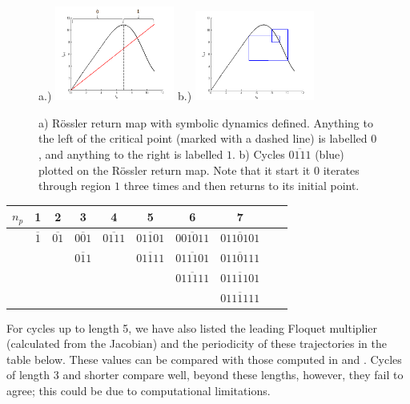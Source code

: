 \documentclass[12 pt]{article}
\begin{document}
\begin{figure}[h]
\centering
a.)  \includegraphics[width=0.35\textwidth]{Figs/Section4/kcdemon.png}
b.)  \includegraphics[width=0.35\textwidth]{Figs/Section4/kccycle4ross.png}
\caption{a) R\"ossler return map with symbolic dynamics defined.  Anything to the left of the critical point (marked with a dashed line) is labelled $0$, and anything to the right is labelled $1$. b) Cycles $\overline{0111}$ (blue) plotted on the R\"ossler return map.  Note that it start it $0$ iterates through region $1$ three times and then returns to its initial point.}
 \label{fig:Ross4cycle}
\end{figure}

\begin{center}
  \begin{tabular}{| l | c | c | c | c | c | c | c | c | r| }
    \hline
    $n_p$ & 1 & 2 & 3 & 4 & 5 & 6 & 7\\ \hline
    & $\overline{1}$ & $\overline{01}$ & $\overline{001}$ & $\overline{0111}$ & $\overline{01101}$ & $\overline{001011}$ & $\overline{0110101}$ \\
    &  &   & $\overline{011}$ &  & $\overline{01111}$ & $\overline{011101}$ & $\overline{0110111}$ \\
    &  &  &  &  &  & $\overline{011111}$ & $\overline{0111101}$ \\
    &  &  &  &  &  &  & $\overline{0111111}$ \\
    \hline
  \end{tabular}
\end{center}

For cycles up to length 5, we have also listed the leading Floquet multiplier (calculated from the Jacobian) and the periodicity of these trajectories in the table below.  These values can be compared with those computed in \cite{CB} and \cite{OtherRoss}.  Cycles of length $3$ and shorter compare well, beyond these lengths, however, they fail to agree; this could be due to computational limitations.
\end{document}

